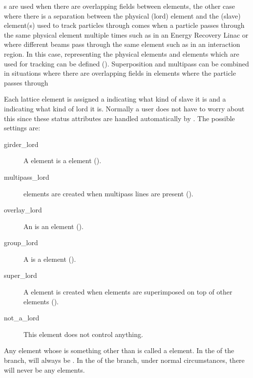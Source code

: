 s are used when there are overlapping fields between elements, the other case where
there is a separation between the physical (lord) element and the (slave) element(s) used to track
particles through comes when a particle passes through the same physical element multiple times such
as in an Energy Recovery Linac or where different beams pass through the same element such as in an
interaction region. In this case,  representing the physical elements and
 elements which are used for tracking can be defined ().
Superposition and multipass can be combined in situations where there are overlapping fields in
elements where the particle passes through

Each lattice element is assigned a  indicating what kind of slave it is and a
 indicating what kind of lord it is. Normally a user does not have to worry about
this since these status attributes are handled automatically by \bmad.  The possible
 settings are:
  \begin{description}
  \item[girder_lord]\Newline 
A  element is a  element  (). 
  \item[multipass_lord]\Newline
{} elements are created when
multipass lines are present (). 
  \item[overlay_lord]\Newline 
An  is an  element (). 
  \item[group_lord]\Newline 
A  is a  element ().
  \item[super_lord]\Newline 
A  element is created when elements are
superimposed on top of other elements ().
  \item[not_a_lord]\Newline
This element does not control anything.
  \end{description}
Any element whose  is something other than
 is called a  element. In the 
of the branch,  will always be
. In the  of the branch, under normal
circumstances, there will never be any  elements.


